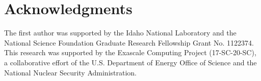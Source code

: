 \section*{A\lowercase{cknowledgments}}

The first author was supported by the Idaho National Laboratory and the National Science Foundation Graduate Research Fellowship Grant No. 1122374. This research was supported by the Exascale Computing Project (17-SC-20-SC), a collaborative effort of the U.S. Department of Energy Office of Science and the National Nuclear Security Administration.
